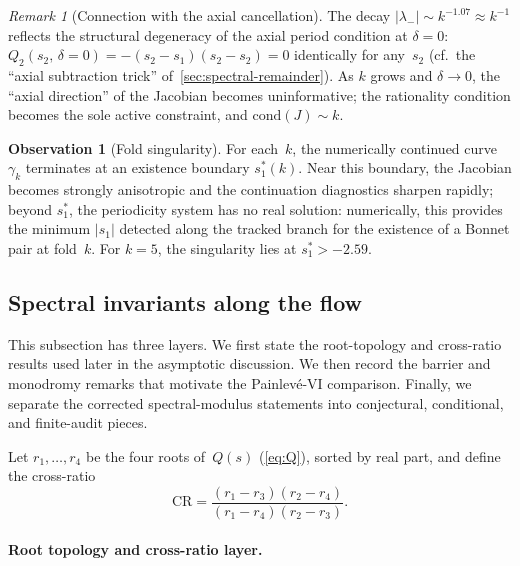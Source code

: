 \documentclass[11pt,a4paper]{article}
\theoremstyle{plain}
\theoremstyle{definition}
\newtheorem{observation}[theorem]{Observation}
\theoremstyle{remark}
\newtheorem{remark}[theorem]{Remark}
\newcommand{\abs}[1]{\lvert #1 \rvert}
\begin{document}
\begin{remark}[Connection with the axial cancellation]
\label{rem:axial-eigenvalue}
The decay $\abs{\lambda_-} \sim k^{-1.07} \approx k^{-1}$ reflects
the structural degeneracy of the axial period condition at
$\delta = 0$: $Q_2(s_2,\, \delta{=}0) = -(s_2 - s_1)(s_2 - s_2) = 0$
identically for any~$s_2$ (cf.\ the ``axial subtraction trick''
of~\cref{sec:spectral-remainder}).  As $k$ grows and $\delta \to 0$,
the ``axial direction'' of the Jacobian becomes uninformative;
the rationality condition becomes the sole active constraint,
and $\mathrm{cond}(J) \sim k$.
\end{remark}

\begin{observation}[Fold singularity]
\label{obs:fold}
For each~$k$, the numerically continued curve $\gamma_k$ terminates at an
existence boundary $s_1^*(k)$.  Near this boundary, the Jacobian becomes
strongly anisotropic and the continuation diagnostics sharpen rapidly;
beyond $s_1^*$, the periodicity system has no real solution:
numerically, this provides the minimum $\abs{s_1}$ detected along the
tracked branch for the existence of a Bonnet pair at fold~$k$.
For $k = 5$, the singularity lies at $s_1^* > -2.59$.
\end{observation}

\subsection{Spectral invariants along the flow}%
\label{sec:spectral-inv}

This subsection has three layers.  We first state the root-topology and
cross-ratio results used later in the asymptotic discussion.  We then record
the barrier and monodromy remarks that motivate the Painlev\'e-VI comparison.
Finally, we separate the corrected spectral-modulus statements into
conjectural, conditional, and finite-audit pieces.

Let $r_1, \ldots, r_4$ be the four roots of~$Q(s)$
(\cref{eq:Q}), sorted by real part, and define the
cross-ratio
\begin{equation}
  \mathrm{CR}
  = \frac{(r_1 - r_3)(r_2 - r_4)}{(r_1 - r_4)(r_2 - r_3)}.
  \label{eq:CR}
\end{equation}

\paragraph{Root topology and cross-ratio layer.}
\end{document}
